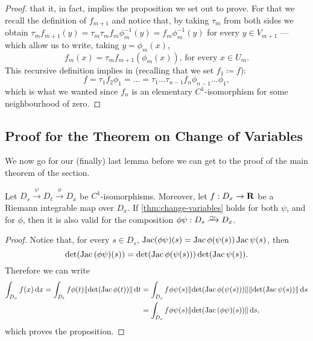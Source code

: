 \begin{proof}
    that it, in fact, implies the proposition we set out to prove. For that we
    recall the definition of \(f_{m+1}\) and notice that, by taking \(\tau_m\) from
    both sides we obtain \(\tau_m f_{m+1}(y) = \tau_{m} \tau_m f_m \phi_m^{-1}(y) =
    f_m \phi_m^{-1}(y)\) for every \(y \in V_{m+1}\) --- which allow us to write,
    taking \(y = \phi_m(x)\),
    \[
        f_m(x) = \tau_m f_{m+1}(\phi_m(x)) \text{, for every } x \in U_m.
    \]
    This recursive definition implies in (recalling that we set \(f_1 \coloneq f\)):
    \[
        f = \tau_1 f_2 \phi_1
        = \dots
        = \tau_1 \dots \tau_{n-1} f_n \phi_{n-1} \dots \phi_{1},
    \]
    which is what we wanted since \(f_n\) is an elementary \(C^{1}\)-isomorphism for
    some neighbourhood of zero.
\end{proof}

\subsection{Proof for the Theorem on Change of Variables}
\label{subsub:change-variables-proof}

We now go for our (finally) last lemma before we can get to the proof of the
main theorem of the section.

\begin{lemma}
    \label{lem:composition-diffeo-change-variables}
    Let \(D_s \xrightarrow{\psi} D_t \xrightarrow{\phi} D_x\) be
    \(C^1\)-isomorphisms. Moreover, let \(f: D_x \to \mathbf{R}\) be a Riemann integrable
    map over \(D_x\). If \cref{thm:change-variables} holds for both \(\psi\), and
    for \(\phi\), then it is also valid for the composition \(\phi \psi: D_s \isoto
    D_x\).
\end{lemma}

\begin{proof}
    Notice that, for every \(s \in D_s\), \(\operatorname{Jac} (\phi \psi)(s) = \operatorname{Jac}
    \phi(\psi(s)) \operatorname{Jac} \psi(s)\), then
    \[
        \det(\operatorname{Jac} {(\phi \psi)}(s)) = \det(\operatorname{Jac} \phi(\psi(s))) \det(\operatorname{Jac} \psi(s)).
    \]
    Therefore we can write
        {\small
            \begin{align*}
                \int_{D_x} f(x)\, \mathrm{d} x
                = \int_{D_t} f \phi(t) \lVert\det(\operatorname{Jac} \phi(t))\rVert\, \mathrm{d} t
                 & = \int_{D_s} f \phi \psi(s) \lVert\det(\operatorname{Jac} \phi(\psi(s)))\rVert
                \lVert\det(\operatorname{Jac} \psi(s))\rVert\, \mathrm{d} s                                         \\
                 & = \int_{D_s} f \phi \psi(s) \lVert\det(\operatorname{Jac}{(\phi \psi)}(s))\rVert\, \mathrm{d} s,
            \end{align*}
        }
    which proves the proposition.
\end{proof}

